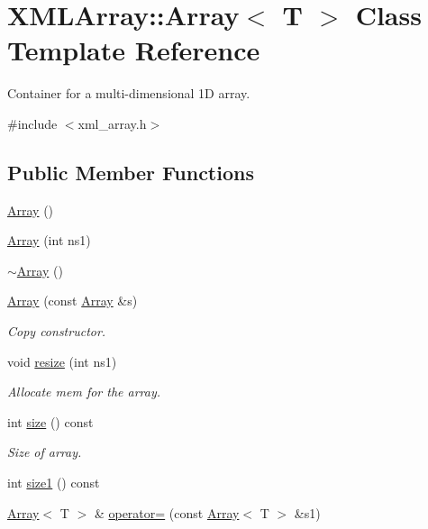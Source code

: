 \hypertarget{classXMLArray_1_1Array}{}\section{X\+M\+L\+Array\+:\+:Array$<$ T $>$ Class Template Reference}
\label{classXMLArray_1_1Array}


Container for a multi-\/dimensional 1D array.  




{\ttfamily \#include $<$xml\+\_\+array.\+h$>$}

\subsection*{Public Member Functions}
\begin{DoxyCompactItemize}
\item 
\mbox{\hyperlink{classXMLArray_1_1Array_a5b81635bef141ec21cbb11a4ae235aff}{Array}} ()
\item 
\mbox{\hyperlink{classXMLArray_1_1Array_ae2ff376197c96aa965c9b04297b013cd}{Array}} (int ns1)
\item 
\mbox{\hyperlink{classXMLArray_1_1Array_ae344c6bdb93a8e4e2b5b42fda7abf94d}{$\sim$\+Array}} ()
\item 
\mbox{\hyperlink{classXMLArray_1_1Array_ab755ad52a24c32ad23940b23b1d03968}{Array}} (const \mbox{\hyperlink{classXMLArray_1_1Array}{Array}} \&s)
\begin{DoxyCompactList}\small\item\em Copy constructor. \end{DoxyCompactList}\item 
void \mbox{\hyperlink{classXMLArray_1_1Array_a470913fde270ad0e578041654e2390f0}{resize}} (int ns1)
\begin{DoxyCompactList}\small\item\em Allocate mem for the array. \end{DoxyCompactList}\item 
int \mbox{\hyperlink{classXMLArray_1_1Array_ab59904c2aa0e31c18c6cd5f5a186e292}{size}} () const
\begin{DoxyCompactList}\small\item\em Size of array. \end{DoxyCompactList}\item 
int \mbox{\hyperlink{classXMLArray_1_1Array_a33e863988af56d045439d31058088c8c}{size1}} () const
\item 
\mbox{\hyperlink{classXMLArray_1_1Array}{Array}}$<$ T $>$ \& \mbox{\hyperlink{classXMLArray_1_1Array_a99fd481573c47ab9a9e35ed597575b0e}{operator=}} (const \mbox{\hyperlink{classXMLArray_1_1Array}{Array}}$<$ T $>$ \&s1)

\end{DoxyCompactItemize}

